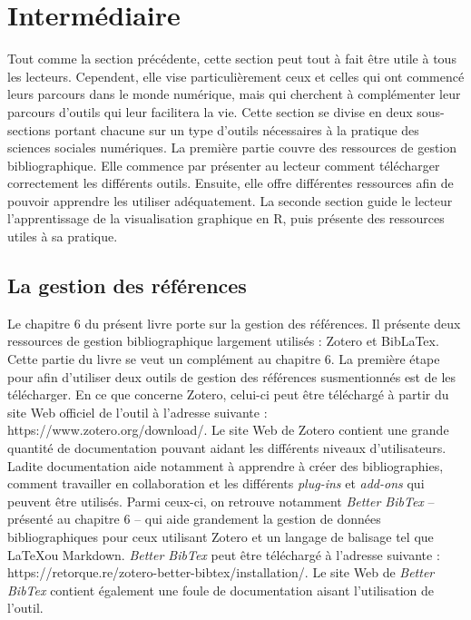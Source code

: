 \documentclass[
  letterpaper,
  DIV=11,
  numbers=noendperiod]{scrreprt}
\begin{document}
\hypertarget{intermuxe9diaire}{%
\section{Intermédiaire}\label{intermuxe9diaire}}

Tout comme la section précédente, cette section peut tout à fait être
utile à tous les lecteurs. Cependent, elle vise particulièrement ceux et
celles qui ont commencé leurs parcours dans le monde numérique, mais qui
cherchent à complémenter leur parcours d'outils qui leur facilitera la
vie. Cette section se divise en deux sous-sections portant chacune sur
un type d'outils nécessaires à la pratique des sciences sociales
numériques. La première partie couvre des ressources de gestion
bibliographique. Elle commence par présenter au lecteur comment
télécharger correctement les différents outils. Ensuite, elle offre
différentes ressources afin de pouvoir apprendre les utiliser
adéquatement. La seconde section guide le lecteur l'apprentissage de la
visualisation graphique en R, puis présente des ressources utiles à sa
pratique.

\hypertarget{la-gestion-des-ruxe9fuxe9rences}{%
\subsection{La gestion des
références}\label{la-gestion-des-ruxe9fuxe9rences}}

Le chapitre 6 du présent livre porte sur la gestion des références. Il
présente deux ressources de gestion bibliographique largement utilisés :
Zotero et BibLaTex. Cette partie du livre se veut un complément au
chapitre 6. La première étape pour afin d'utiliser deux outils de
gestion des références susmentionnés est de les télécharger. En ce que
concerne Zotero, celui-ci peut être téléchargé à partir du site Web
officiel de l'outil à l'adresse suivante :
https://www.zotero.org/download/. Le site Web de Zotero contient une
grande quantité de documentation pouvant aidant les différents niveaux
d'utilisateurs. Ladite documentation aide notamment à apprendre à créer
des bibliographies, comment travailler en collaboration et les
différents \emph{plug-ins} et \emph{add-ons} qui peuvent être utilisés.
Parmi ceux-ci, on retrouve notamment \emph{Better BibTex} -- présenté au
chapitre 6 -- qui aide grandement la gestion de données bibliographiques
pour ceux utilisant Zotero et un langage de balisage tel que \LaTeX ou
Markdown. \emph{Better BibTex} peut être téléchargé à l'adresse suivante
: https://retorque.re/zotero-better-bibtex/installation/. Le site Web de
\emph{Better BibTex} contient également une foule de documentation
aisant l'utilisation de l'outil.
\end{document}
